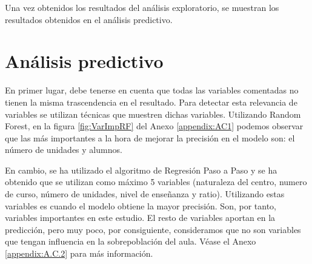 Una vez obtenidos los resultados del análisis exploratorio, se muestran los resultados obtenidos en el análisis predictivo.

\section{Análisis predictivo}
En primer lugar, debe tenerse en cuenta que todas las variables comentadas no tienen la misma trascendencia en el resultado. Para detectar esta relevancia de variables se utilizan técnicas que muestren dichas variables. Utilizando Random Forest, en la figura \ref{fig:VarImpRF} del Anexo \ref{appendix:AC1} podemos observar que las más importantes a la hora de mejorar la precisión en el modelo son: el número de unidades y alumnos.

En cambio, se ha utilizado el algoritmo de Regresión Paso a Paso y se ha obtenido que se utilizan como máximo 5 variables (naturaleza del centro, numero de curso, número de unidades, nivel de enseñanza y ratio). Utilizando estas variables es cuando el modelo obtiene la mayor precisión. Son, por tanto, variables importantes en este estudio. El resto de variables aportan en la predicción, pero muy poco, por consiguiente, consideramos que no son variables que tengan influencia en la sobrepoblación del aula. Véase el Anexo \ref{appendix:A.C.2} para más información.




